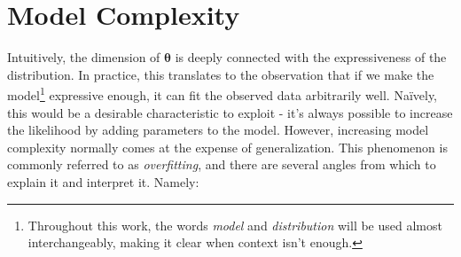 \section{Model Complexity}
\label{section:modelcomplexity}
Intuitively, the dimension of $\bm{\theta}$ is deeply connected with the expressiveness
of the distribution. In practice, this translates to the observation that if we
make the model\footnote{Throughout this work, the words \emph{model}
and \emph{distribution} will be used almost interchangeably, making it clear when context isn't
enough.} expressive enough, it can fit the observed data arbitrarily well. Naïvely,
this would be a desirable characteristic to exploit - it's always possible to increase
the likelihood by adding parameters to the model. However, increasing model
complexity normally comes at the expense of generalization. This phenomenon is
commonly referred to as \emph{overfitting}, and there are several
angles from which to explain it and interpret it. Namely:
